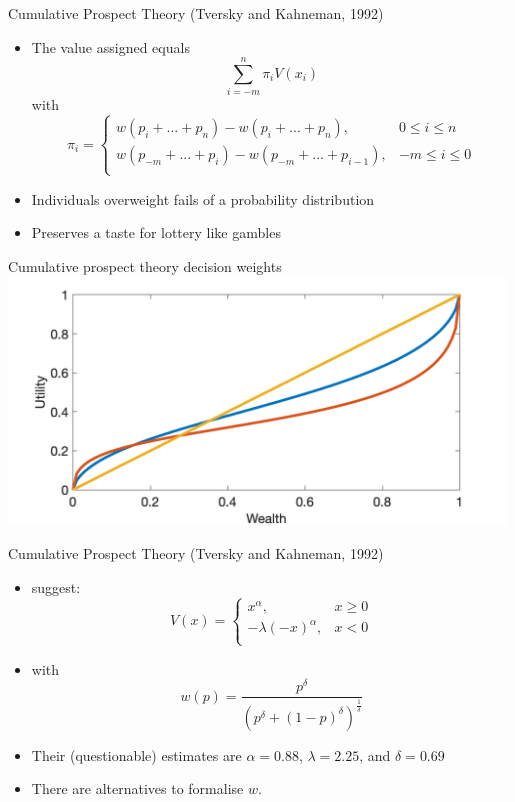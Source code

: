 \documentclass[11pt, aspectratio=169]{beamer}
\begin{document}
\begin{frame}{Cumulative Prospect Theory (Tversky and Kahneman, 1992)}
    \begin{itemize}
       \item The value assigned equals
        \[ \sum_{i=-m}^{n} \pi_i V(x_i)\]
        with\\
            \begin{equation}
                \pi_i = \begin{cases}
                w(p_i+...+p_n) - w(p_i+...+p_n),  & 0\leq i \leq  n\\
                w(p_{-m}+...+p_i) - w(p_{-m}+...+p_{i-1}),  & -m\leq i \leq 0\\
            \end{cases}
            \end{equation}\bigskip
        \item Individuals overweight fails of a probability distribution\bigskip
        \item Preserves a taste for lottery like gambles\bigskip
    \end{itemize}
\end{frame}

\begin{frame}{Cumulative prospect theory decision weights}
\centering
\includegraphics[width= 0.99\textwidth]{cpt_weights}
\end{frame}

\begin{frame}{Cumulative Prospect Theory (Tversky and Kahneman, 1992)}
    \begin{itemize}
        \item \citet{TverskyKahneman1992} suggest:
\begin{equation}
    V(x) = \begin{cases}
    x^\alpha,  & x\geq 0\\
    -\lambda (-x)^\alpha,  & x< 0\\
    \end{cases}
\end{equation}\medskip
\item with \[w(p) = \frac{p^{\delta}}{(p^{\delta}+(1-p)^{\delta})^{\frac{1}{\delta}}}\]
\item Their (questionable) estimates are $\alpha =0.88$, $\lambda =2.25$, and  $\delta =0.69$\medskip
    \item There are alternatives to formalise $w$.
\end{itemize}
\end{frame}
\end{document}
